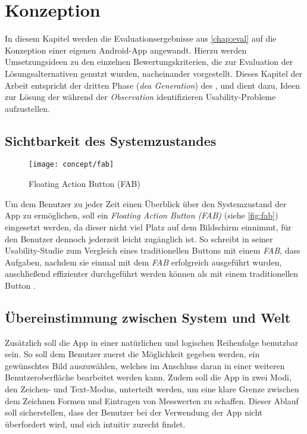 \chapter{Konzeption}\label{chap:concept}
In diesem Kapitel werden die Evaluationsergebnisse aus \autoref{chap:eval} auf die Konzeption einer eigenen Android-App angewandt.
Hierzu werden Umsetzungsideen zu den einzelnen Bewertungskriterien, die zur Evaluation der Lösungsalternativen genutzt wurden, nacheinander vorgestellt.
Dieses Kapitel der Arbeit entspricht der dritten Phase (\emph{dea Generation}) des \hcdp{}, und dient dazu, Ideen zur Lösung der während der \emph{Observation} identifizieren Usability-Probleme aufzustellen.

\section{Sichtbarkeit des Systemzustandes}
\begin{wrapfigure}{R}{0.5\textwidth}
  \centering
  \texttt{[image: concept/fab]}
  \caption{Floating Action Button (FAB)}
  \label{fig:fab}
\end{wrapfigure}

Um dem Benutzer zu jeder Zeit einen Überblick über den Systemzustand der App zu ermöglichen, soll ein \emph{Floating Action Button (FAB)} (siehe \autoref{fig:fab}) eingesetzt werden, da dieser nicht viel Platz auf dem Bildschirm einnimmt, für den Benutzer dennoch jederzeit leicht zugänglich ist.
So schreibt \citeauthor{SJ16} in seiner Usability-Studie zum Vergleich eines traditionellen Buttons mit einem \emph{FAB}, dass Aufgaben, nachdem sie einmal mit dem \emph{FAB} erfolgreich ausgeführt wurden, anschließend effizienter durchgeführt werden können als mit einem traditionellen Button \citep[Seiten 14--16]{SJ16}.

\section{Übereinstimmung zwischen System und Welt}
Zusätzlich soll die App in einer natürlichen und logischen Reihenfolge benutzbar sein.
So soll dem Benutzer zuerst die Möglichkeit gegeben werden, ein gewünschtes Bild auszuwählen, welches im Anschluss daran in einer weiteren Benutzeroberfläche bearbeitet werden kann.
Zudem soll die App in zwei Modi, den Zeichen- und Text-Modus, unterteilt werden, um eine klare Grenze zwischen dem Zeichnen Formen und Eintragen von Messwerten zu schaffen.
Dieser Ablauf soll sicherstellen, dass der Benutzer bei der Verwendung der App nicht überfordert wird, und sich intuitiv zurecht findet.

